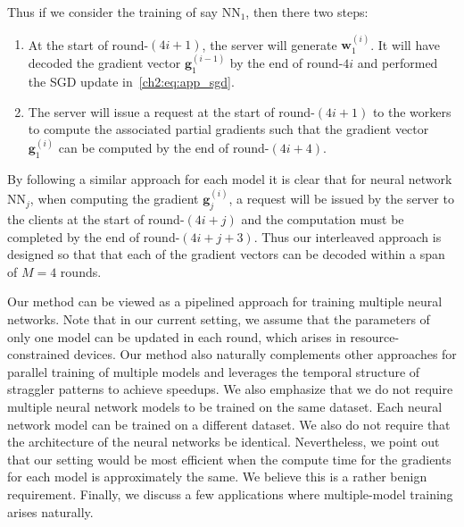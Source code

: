 Thus if we consider the training of say  $\mathrm{NN}_1$, then there two steps:

\begin{enumerate}
    \item At the start of round-$(4  i+ 1)$, the server will generate ${\mathbf w}_1^{(i)}$. It will have decoded the gradient vector ${\mathbf g}_1^{(i-1)}$ by the end of round-$4 i$ and performed the SGD update in~\eqref{ch2:eq:app_sgd}.
    
    \item The server will issue a request at the start of round-$(4i +1)$ to the workers to compute the associated partial gradients such that the gradient vector ${\mathbf{g}_1^{(i)}}$ can be computed by the end of round-$(4 i + 4)$. 
\end{enumerate}

By following a similar approach for each model it is clear that for neural network $\mathrm{NN}_j$, when computing the gradient ${\mathbf g}_j^{(i)}$, a request will be issued by the server to the clients at the start of round-$(4i+j)$ and the computation must be completed by the end of round-$(4i+j +3)$. Thus our interleaved approach is designed so that that each of the gradient vectors can be decoded within a span of $M=4$ rounds.

Our method can be viewed as a pipelined approach for training multiple neural networks. Note that in our current setting, we assume that the parameters of only one model can be updated in each round, which arises in resource-constrained devices. Our method also naturally complements other approaches for parallel training of multiple models and leverages the temporal structure of straggler patterns to achieve speedups. We also emphasize that we do not require multiple neural network models to be trained on the same dataset. Each neural network model can be trained on a different dataset. We also do not require that the architecture of the neural networks be identical. Nevertheless, we point out that our setting would be most efficient when the compute time for the gradients for each model is approximately the same. We believe this is a rather benign requirement. Finally, we discuss a few applications where multiple-model training arises naturally.

